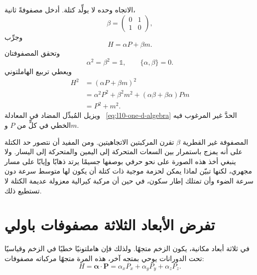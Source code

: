 الاتجاه وحده لا يولِّد كتلة. أدخل مصفوفةً ثانية،
\begin{equation}
\beta=
\begin{pmatrix}
0&1\\
1&0
\end{pmatrix},
\end{equation}
وجرِّب
\begin{equation}
H=\alpha P+\beta m.
\label{eq:l10-massive-one-d}
\end{equation}
وتحقق المصفوفتان
\begin{equation}
\alpha^2=\beta^2=\mathbb{1},
\qquad
\{\alpha,\beta\}=0.
\label{eq:l10-one-d-algebra}
\end{equation}
ويعطي تربيع الهاملتوني
\begin{align}
H^2
&=(\alpha P+\beta m)^2\\
&=\alpha^2P^2+\beta^2m^2
  +(\alpha\beta+\beta\alpha)Pm\\
&=P^2+m^2.
\label{eq:l10-one-d-dispersion}
\end{align}
ويزيل المُبدِّل المضاد في المعادلة ~\eqref{eq:l10-one-d-algebra} الحدَّ غير المرغوب فيه الخطي في كلٍّ من \(P\) و\(m\).

المصفوفة غير القطرية \(\beta\) تقرن المركبتين الاتجاهيتين. ومن المفيد أن نتصور حد الكتلة على أنه يمزج باستمرار بين السعات المتحركة إلى اليمين والمتحركة إلى اليسار. ولا ينبغي أخذ هذه الصورة على نحو حرفي بوصفها جسيمًا يرتد ذهابًا وإيابًا على مسار مجهري، لكنها تبيّن لماذا يمكن لحزمة موجية ذات كتلة أن يكون لها متوسط سرعة دون سرعة الضوء وأن تمتلك إطار سكون، في حين أن مركبة كيرالية معزولة عديمة الكتلة لا تستطيع ذلك.

\begin{classroomqa}
\end{classroomqa}

\section{تفرض الأبعاد الثلاثة مصفوفات باولي}

في ثلاثة أبعاد مكانية، يكون الزخم متجهًا. ولذلك فإن هاملتونيًا خطيًا في الزخم وقياسيًا تحت الدورانات يوحي بمتجه آخر، هذه المرة متجهًا مركباته مصفوفات:
\begin{equation}
H=\boldsymbol{\alpha}\cdot\mathbf P
=\alpha_xP_x+\alpha_yP_y+\alpha_zP_z.
\label{eq:l10-three-d-ansatz}
\end{equation}

